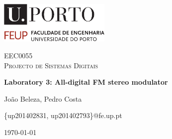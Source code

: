 \documentclass[letterpaper,12pt]{article}
\begin{document}
\begin{titlepage}
	\centering
	\includegraphics[width=0.4\textwidth]{uporto-feup.pdf}\par\vspace{1cm}
	{\scshape\Large EEC0055\\ Projecto de Sistemas Digitais\par}
	\vspace{1.5cm}
	{\huge\bfseries Laboratory 3: All-digital FM stereo modulator\par}
	\vspace{2.5cm}
	{\Large João Beleza, Pedro Costa\par}
	\vspace{0.25cm}
	{\{up201402831, up201402793\}@fe.up.pt\par}
	\vfill

	\vfill

	{\large \today\par} %
\end{titlepage}








\end{document}
